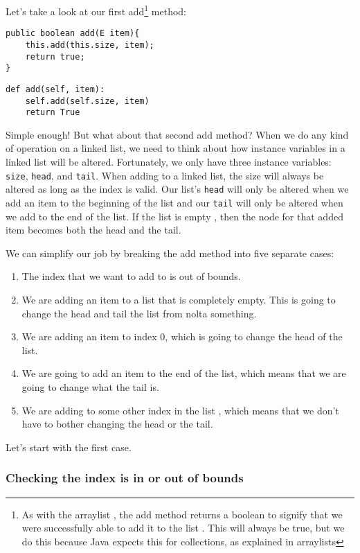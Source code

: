 Let's take a look at our first add\footnote{As with the arraylist , the add method returns a boolean to signify that we were successfully able to add it to the list . This will always be true, but we do this because Java expects this for collections, as explained in arraylists } method:

\begin{verbatim}
public boolean add(E item){
	this.add(this.size, item);
	return true;
}
\end{verbatim}

\begin{verbatim}
def add(self, item):
	self.add(self.size, item)
	return True
\end{verbatim}

Simple enough!  But what about that second add method?
When we do any kind of operation on a linked list, we need to think about how instance variables in a linked list will be altered. 
Fortunately, we only have three instance variables: \texttt{size}, \texttt{head}, and \texttt{tail}.
When adding to a linked list, the size will always be altered as long as the index is valid.
Our list's \texttt{head} will only be altered when we add an item to the beginning of the list and our \texttt{tail} will only be altered when we add to the end of the list.  If the list is empty , then the node for that added item becomes both the head and the tail.



We can simplify our job by breaking the add method into five separate cases:
\begin{enumerate}
	\item The index that we want to add to is out of bounds.
	\item We are adding an item to a list that is completely empty. This is going to change the head and tail the list from nolta something. 
	\item We are adding an item to index 0, which is going to change the head of the list.
	\item We are going to add an item to the end of the list, which means that we are going to change what the tail is.
	\item We are adding to some other index in the list , which means that we don't have to bother changing the head or the tail.
\end{enumerate}


Let's start with the first case.

\subsubsection{Checking the index is in or out of bounds}

